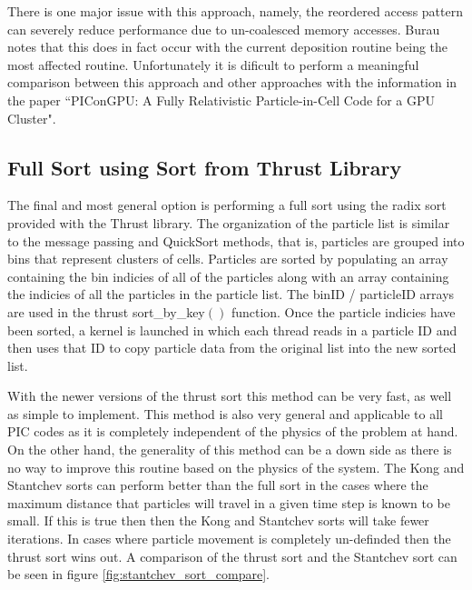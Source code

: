 	There is one major issue with this approach, namely, the reordered access pattern can severely reduce performance due to un-coalesced memory accesses. Burau notes that this does in fact occur with the current deposition routine being the most affected routine. Unfortunately it is dificult to perform a meaningful comparison between this approach and other approaches with the information in the paper ``PIConGPU: A Fully Relativistic Particle-in-Cell Code for a GPU Cluster". \cite{Burau2010}

	\subsection{Full Sort using Sort from Thrust Library}
	The final and most general option is performing a full sort using the radix sort provided with the Thrust library.\cite{NVIDIACorporation2011a} The organization of the particle list is similar to the message passing and QuickSort methods, that is, particles are grouped into bins that represent clusters of cells. Particles are sorted by populating an array containing the bin indicies of all of the particles along with an array containing the indicies of all the particles in the particle list. The binID / particleID arrays are used in the thrust sort\_by\_key$()$ function. Once the particle indicies have been sorted, a kernel is launched in which each thread reads in a particle ID and then uses that ID to copy particle data from the original list into the new sorted list. 

	With the newer versions of the thrust sort this method can be very fast, as well as simple to implement. This method is also very general and applicable to all PIC codes as it is completely independent of the physics of the problem at hand. On the other hand, the generality of this method can be a down side as there is no way to improve this routine based on the physics of the system. The Kong and Stantchev sorts can perform better than the full sort in the cases where the maximum distance that particles will travel in a given time step is known to be small. If this is true then then the Kong and Stantchev sorts will take fewer iterations. In cases where particle movement is completely un-definded then the thrust sort wins out. A comparison of the thrust sort and the Stantchev sort can be seen in figure \ref{fig:stantchev_sort_compare}. 





